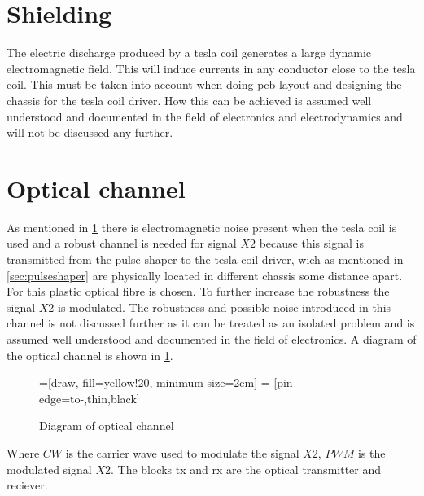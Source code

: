 \section{Shielding}
\label{sec:shielding}
The electric discharge produced by a tesla coil generates a large dynamic electromagnetic field. This will induce currents in any conductor close to the tesla coil. This must be taken into account when doing pcb layout and designing the chassis for the tesla coil driver. How this can be achieved is assumed well understood and documented in the field of electronics and electrodynamics and will not be discussed any further.

\section{Optical channel}
\label{sec:optical}

As mentioned in \cref{sec:shielding} there is electromagnetic noise present when the tesla coil is used and a robust channel is needed for signal $X2$ because this signal is transmitted from the pulse shaper to the tesla coil driver, wich as mentioned in \cref{sec:pulseshaper} are physically located in different chassis some distance apart. For this plastic optical fibre is chosen. To further increase the robustness the signal $X2$ is modulated. The robustness and possible noise introduced in this channel is not discussed further as it can be treated as an isolated problem and is assumed well understood and documented in the field of electronics. A diagram of the optical channel is shown in \cref{fig:opticalchannel}.

\begin{figure}[H]
    \centering
    =[draw, fill=yellow!20, minimum size=2em]
     = [pin edge={to-,thin,black}]
    \caption{Diagram of optical channel}
    \label{fig:opticalchannel}
\end{figure}

Where $CW$ is the carrier wave used to modulate the signal $X2$, $PWM$ is the modulated signal $X2$. The blocks tx and rx are the optical transmitter and reciever.